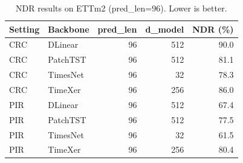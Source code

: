 \begin{table}[t]
\centering
\small
\caption{NDR results on ETTm2 (pred\_len=96). Lower is better.}
\label{tab:ndr-ettm2-pl96}
\begin{tabular}{llrrr}
\toprule
Setting & Backbone & pred\_len & d\_model & NDR (\%) \\
\midrule
CRC & DLinear  & 96 & 512 & 90.0 \\
CRC & PatchTST & 96 & 512 & 81.1 \\
CRC & TimesNet & 96 & 32  & 78.3 \\
CRC & TimeXer  & 96 & 256 & 86.0 \\
\midrule
PIR & DLinear  & 96 & 512 & 67.4 \\
PIR & PatchTST & 96 & 512 & 77.5 \\
PIR & TimesNet & 96 & 32  & 61.5 \\
PIR & TimeXer  & 96 & 256 & 80.4 \\
\bottomrule
\end{tabular}
\end{table}
